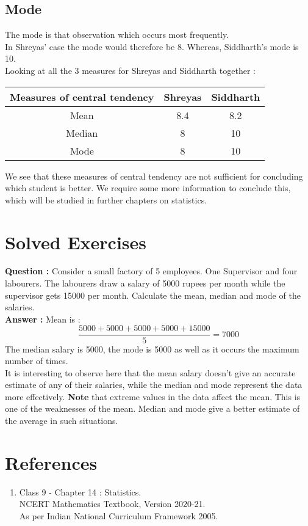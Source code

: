 \documentclass[12pt, letterpaper]{article}
\begin{document}
 \subsection{Mode}
The mode is that observation which occurs most frequently.\\
In Shreyas' case the mode would therefore be 8. Whereas, Siddharth's mode is 10.\\
Looking at all the 3 measures for Shreyas and Siddharth together :
\begin{center}
\begin{tabular}{ |c|c|c| } 
 \hline
 \textbf{Measures of central tendency} & \textbf{Shreyas} & \textbf{Siddharth} \\
 \hline
 Mean & 8.4 & 8.2 \\ 
 Median & 8 & 10 \\
 Mode & 8 & 10 \\
 \hline
\end{tabular}
\end{center}
We see that these measures of central tendency are not sufficient for concluding which student is better. We require some more information to conclude this, which will be studied in further chapters on statistics.

\section{Solved Exercises}
\textbf{Question :} Consider a small factory of 5 employees. One Supervisor and four labourers. The labourers draw a salary of 5000 rupees per month while the supervisor gets 15000 per month. Calculate the mean, median and mode of the salaries.\\
\textbf{Answer :} Mean is : 
\begin{displaymath}
    \frac{5000+5000+5000+5000+15000}{5} = 7000
\end{displaymath}
The median salary is 5000, the mode is 5000 as well as it occurs the maximum number of times.\\
It is interesting to observe here that the mean salary doesn't give an accurate estimate of any of their salaries, while the median and mode represent the data more effectively. \textbf{Note} that extreme values in the data affect the mean. This is one of the weaknesses of the mean. Median and mode give a better estimate of the average in such situations.

\section{References}
\begin{enumerate}
    \item Class 9 - Chapter 14 : Statistics.\\ 
    NCERT Mathematics Textbook, Version 2020-21.\\
    As per Indian National Curriculum Framework 2005.
\end{enumerate}
\end{document}
